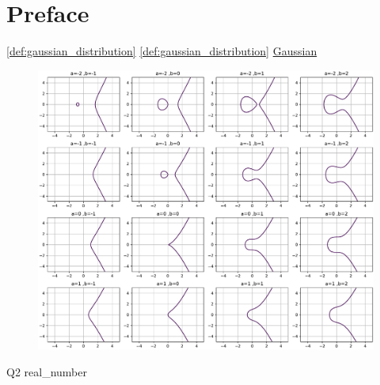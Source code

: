 \chapter{Preface}
\cite{kitaev2002classical}
\cite{childsUniversalComputationQuantum2009}
\autoref{def:gaussian_distribution}
\cref{def:gaussian_distribution}
\hyperref[def:gaussian_distribution]{Gaussian}

\begin{figure}[!ht]
    \centering
    \includegraphics[width=1\linewidth]{./figure/elliptic_curves.pdf}
    \caption{}
\end{figure}

\gls{Q2}
\gls{real_number}